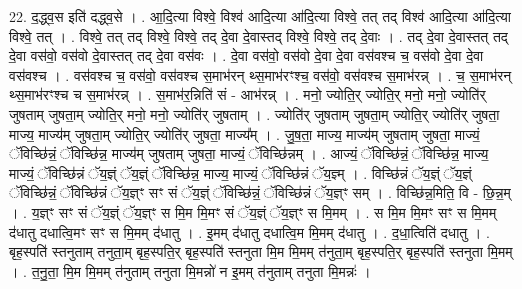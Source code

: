 \documentclass[17pt]{extarticle}
\begin{document}
22. द॒द्ध्व॒स इति॑ दद्ध्व॒से । . आ॒दि॒त्या विश्वे॒ विश्व॑ आदि॒त्या आ॑दि॒त्या विश्वे॒ तत् तद् विश्व॑ आदि॒त्या आ॑दि॒त्या विश्वे॒ तत् । . विश्वे॒ तत् तद् विश्वे॒ विश्वे॒ तद् दे॒वा दे॒वास्तद् विश्वे॒ विश्वे॒ तद् दे॒वाः । . तद् दे॒वा दे॒वास्तत् तद् दे॒वा वस॑वो॒ वस॑वो दे॒वास्तत् तद् दे॒वा वस॑वः । . दे॒वा वस॑वो॒ वस॑वो दे॒वा दे॒वा वस॑वश्च च॒ वस॑वो दे॒वा दे॒वा वस॑वश्च । . वस॑वश्च च॒ वस॑वो॒ वस॑वश्च स॒माभ॑रन् थ्स॒माभ॑रꣳश्च॒ वस॑वो॒ वस॑वश्च स॒माभ॑रन्न् । . च॒ स॒माभ॑रन् थ्स॒माभ॑रꣳश्च च स॒माभ॑रन्न् । . स॒माभ॑र॒न्निति॑ सं - आभ॑रन्न् । . मनो॒ ज्योति॒र् ज्योति॒र् मनो॒ मनो॒ ज्योति॑र् जुषताम् जुषता॒म् ज्योति॒र् मनो॒ मनो॒ ज्योति॑र् जुषताम् । . ज्योति॑र् जुषताम् जुषता॒म् ज्योति॒र् ज्योति॑र् जुषता॒ माज्य॒ माज्य॑म् जुषता॒म् ज्योति॒र् ज्योति॑र् जुषता॒ माज्य᳚म् । . जु॒ष॒ता॒ माज्य॒ माज्य॑म् जुषताम् जुषता॒ माज्यं॒ ॅविच्छि॑न्नं॒ ॅविच्छि॑न्न॒ माज्य॑म् जुषताम् जुषता॒ माज्यं॒ ॅविच्छि॑न्नम् । . आज्यं॒ ॅविच्छि॑न्नं॒ ॅविच्छि॑न्न॒ माज्य॒ माज्यं॒ ॅविच्छि॑न्नं ॅय॒ज्ञ्ं ॅय॒ज्ञ्ं ॅविच्छि॑न्न॒ माज्य॒ माज्यं॒ ॅविच्छि॑न्नं ॅय॒ज्ञ्म् । . विच्छि॑न्नं ॅय॒ज्ञ्ं ॅय॒ज्ञ्ं ॅविच्छि॑न्नं॒ ॅविच्छि॑न्नं ॅय॒ज्ञ्ꣳ सꣳ सं ॅय॒ज्ञ्ं ॅविच्छि॑न्नं॒ ॅविच्छि॑न्नं ॅय॒ज्ञ्ꣳ सम् । . विच्छि॑न्न॒मिति॒ वि - छि॒न्न॒म् । . य॒ज्ञ्ꣳ सꣳ सं ॅय॒ज्ञ्ं ॅय॒ज्ञ्ꣳ स मि॒म मि॒मꣳ सं ॅय॒ज्ञ्ं ॅय॒ज्ञ्ꣳ स मि॒मम् । . स मि॒म मि॒मꣳ सꣳ स मि॒मम् द॑धातु दधात्वि॒मꣳ सꣳ स मि॒मम् द॑धातु । . इ॒मम् द॑धातु दधात्वि॒म मि॒मम् द॑धातु । . द॒धा॒त्विति॑ दधातु । . बृह॒स्पति॑ स्तनुताम् तनुता॒म् बृह॒स्पति॒र् बृह॒स्पति॑ स्तनुता मि॒म मि॒मम् त॑नुता॒म् बृह॒स्पति॒र् बृह॒स्पति॑ स्तनुता मि॒मम् । . त॒नु॒ता॒ मि॒म मि॒मम् त॑नुताम् तनुता मि॒मन्नो॑ न इ॒मम् त॑नुताम् तनुता मि॒मन्नः॑ । \newline
\end{document}
